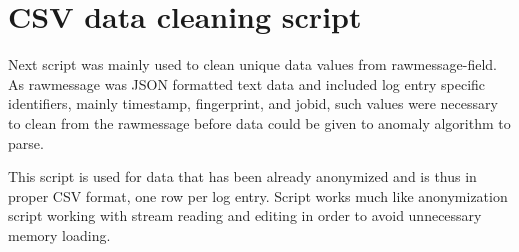 \clearpage


\section{CSV data cleaning script}\label{sec:app-data-cleaning-script}

Next script was mainly used to
clean unique data values from rawmessage-field.
As rawmessage was JSON formatted text data
and included log entry specific identifiers,
mainly timestamp, fingerprint, and jobid,
such values were necessary to clean from the rawmessage
before data could be given to anomaly algorithm to parse.

This script is used for data
that has been already anonymized
and is thus in proper CSV format,
one row per log entry.
Script works much like anonymization script
working with stream reading and editing
in order to avoid unnecessary memory loading.


